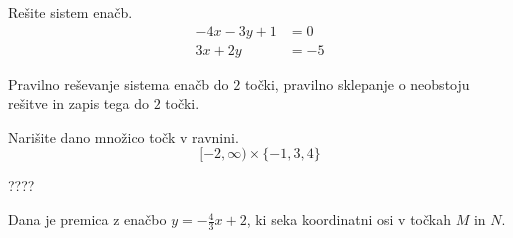 \documentclass[addpoints]{exam}
\begin{document}
\begin{questions}
\newpage
    \question[4]
    Rešite sistem enačb.
    $$ \begin{aligned}
        -4x-3y+1&=0 \\ 3x+2y&=-5
    \end{aligned} $$
    
    
    \begin{solution}[11cm]
        Pravilno reševanje sistema enačb do $2$ točki, pravilno sklepanje o neobstoju rešitve in zapis tega do $2$ točki.
    \end{solution}





    \question[4]
    Narišite dano množico točk v ravnini.
        $$[-2,\infty)\times \{-1,3,4\}$$

            \begin{solution}[2cm]
                ????
            \end{solution}

\newpage

        


    \question
    Dana je premica z enačbo $y=-\frac{4}{3}x+2$, ki seka koordinatni osi v točkah $M$ in $N$.

\end{questions}
\end{document}
